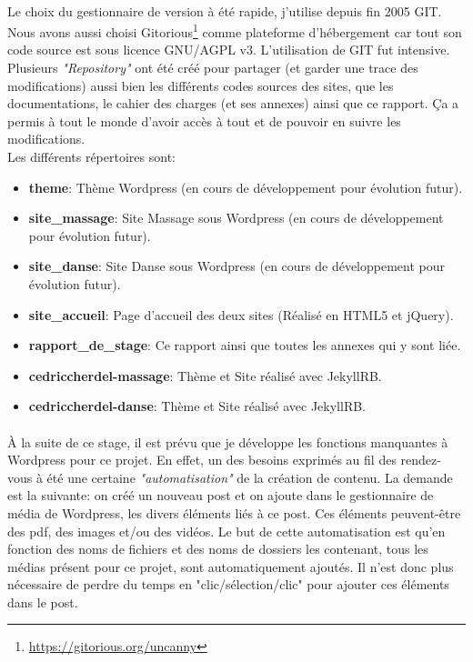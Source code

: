\documentclass[11pt,a4paper]{report}
\begin{document}
			\paragraph*{}Le choix du gestionnaire de version à été rapide, j'utilise depuis fin 2005 GIT. Nous avons aussi choisi Gitorious\footnote{\url{https://gitorious.org/uncanny}} comme plateforme d'hébergement car tout son code source est sous licence GNU/AGPL v3. L'utilisation de GIT fut intensive. Plusieurs \textit{"Repository"} ont été créé pour partager (et garder une trace des modifications) aussi bien les différents codes sources des sites, que les documentations, le cahier des charges (et ses annexes) ainsi que ce rapport. Ça a permis à tout le monde d'avoir accès à tout et de pouvoir en suivre les modifications.\\
			Les différents répertoires sont:
				\begin{itemize}
					\item \textbf{theme}: Thème Wordpress (en cours de développement pour évolution futur).
					\item \textbf{site\_massage}: Site Massage sous Wordpress (en cours de développement pour évolution futur).
					\item \textbf{site\_danse}: Site Danse sous Wordpress (en cours de développement pour évolution futur).
					\item \textbf{site\_accueil}: Page d'accueil des deux sites (Réalisé en HTML5 et jQuery).
					\item \textbf{rapport\_de\_stage}: Ce rapport ainsi que toutes les annexes qui y sont liée.
					\item \textbf{cedriccherdel-massage}: Thème et Site réalisé avec JekyllRB.
					\item \textbf{cedriccherdel-danse}: Thème et Site réalisé avec JekyllRB.
				\end{itemize}
			\paragraph*{}À la suite de ce stage, il est prévu que je développe les fonctions manquantes à Wordpress pour ce projet. En effet, un des besoins exprimés au fil des rendez-vous à été une certaine \textit{"automatisation"} de la création de contenu. La demande est la suivante: on créé un nouveau post et on ajoute dans le gestionnaire de média de Wordpress, les divers éléments liés à ce post. Ces éléments peuvent-être des pdf, des images et/ou des vidéos. Le but de cette automatisation est qu'en fonction des noms de fichiers et des noms de dossiers les contenant, tous les médias présent pour ce projet, sont automatiquement ajoutés. Il n'est donc plus nécessaire de perdre du temps en "clic/sélection/clic" pour ajouter ces éléments dans le post.
\end{document}
